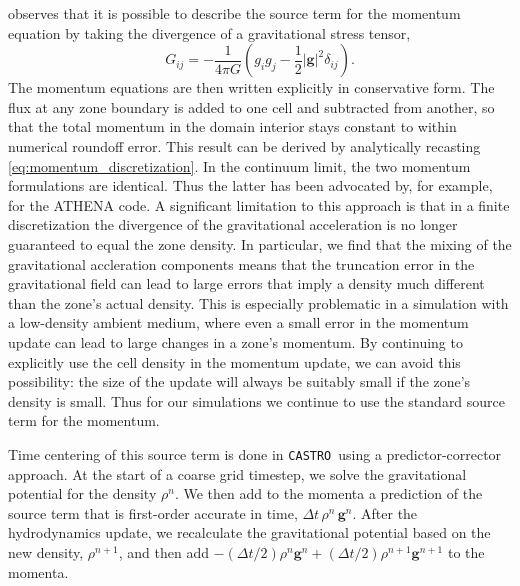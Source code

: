 \documentclass[iop]{../emulateapj}
\newcommand{\castro}{\texttt{CASTRO}}
\begin{document}
\citet[Chapter 4]{shu:1992} observes that it is possible to describe the source term 
for the momentum equation by taking the divergence of a gravitational stress tensor,
\begin{equation}
  G_{ij} = -\frac{1}{4\pi G}\left(g_i g_j - \frac{1}{2}|\mathbf{g}|^2\delta_{ij}\right).
\end{equation}
The momentum equations are then written explicitly in conservative form.
The flux at any zone boundary is added to one cell and
subtracted from another, so that the total momentum in the domain interior stays constant to
within numerical roundoff error. This result can be derived by analytically recasting 
\autoref{eq:momentum_discretization}. In the continuum limit, the two momentum
formulations are identical. Thus the latter has been advocated by, for example, 
\cite{jiang:2013} for the ATHENA code. A significant limitation to this approach is that in a finite discretization 
the divergence of the gravitational acceleration is no longer guaranteed to equal
the zone density. In particular, we find that the mixing of the gravitational accleration components
means that the truncation error in the gravitational field can lead to large errors
that imply a density much different than the zone's actual density. This is especially
problematic in a simulation with a low-density ambient medium, where even a small error 
in the momentum update can lead to large changes in a zone's momentum. By continuing to explicitly
use the cell density in the momentum update, we can avoid this possibility: the size of the update
will always be suitably small if the zone's density is small. Thus for our simulations
we continue to use the standard source term for the momentum.

Time centering of this source term is done in \castro\ using a predictor-corrector approach.
At the start of a coarse grid timestep, we solve the gravitational potential for the density $\rho^n$.
We then add to the momenta a prediction of the source term that is first-order accurate in time, 
$\Delta t\, \rho^n\, \mathbf{g}^n$. After the hydrodynamics update, we recalculate
the gravitational potential based on the new density, $\rho^{n+1}$, and then add 
$-(\Delta t/2) \rho^n \mathbf{g}^n + (\Delta t/2) \rho^{n+1} \mathbf{g}^{n+1}$ to the momenta.
\end{document}
